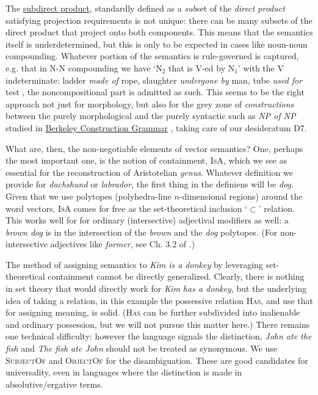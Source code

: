 \documentclass[output=paper,colorlinks=true,citecolor=brown]{langscibook}
\begin{document}
\noindent
The \href{https://en.wikipedia.org/wiki/Subdirect_product}{subdirect product},
standardly defined as a \emph{sub}set of the \emph{direct product} satisfying
projection requirements is not unique: there can be many subsets of the direct
product that project onto both components. This means that the semantics
itself is underdetermined, but this is only to be expected in cases like
noun-noun compounding. Whatever portion of the semantics is rule-governed is
captured, e.g. that in N-N compounding we have `N$_2$ that is V-ed by N$_1$'
with the V indeterminate: ladder \emph{made of} rope, slaughter \emph{undergone
  by} man, tube \emph{used for} test \citep{Kiparsky:1982b}, the
noncompositional part is admitted as such. This seems to be the right approach
not just for morphology, but also for the grey zone of \emph{constructions}
between the purely morphological and the purely syntactic such as \emph{NP of
  NP} studied in
\href{https://www1.icsi.berkeley.edu/~kay/bcg/ConGram.html}{Berkeley
  Construction Grammar} \citep{Kornai:1988a}, taking care of our desideratum
D7.

\medskip\noindent What are, then, the non-negotiable elements of vector
semantics? One, perhaps the most important one, is the notion of containment,
\textsc{IsA}, which we see as essential for the reconstruction of Aristotelian
\emph{genus}. Whatever definition we provide for \emph{dachshund} or \emph{labrador}, the first thing in the definiens will be \emph{dog}. Given that we
use polytopes (polyhedra-line $n$-dimensional regions) around the word
vectors, \textsc{IsA} comes for free as the set-theoretical inclusion `$\subset$'
relation. This works well for for ordinary (intersective) adjectival modifiers
as well: a \emph{brown dog} is in the intersection of the \emph{brown} and the
\emph{dog} polytopes. (For non-intersective adjectives like \emph{former}, see
Ch. 3.2 of \cite{Kornai:2022}.)

The method of assigning semantics to \emph{Kim is a donkey} by leveraging
set-theo\-ret\-ical containment cannot be directly generalized.  Clearly,
there is nothing in set theory that would directly work for \emph{Kim has a
  donkey}, but the underlying idea of taking a relation, in this example the
possessive relation \textsc{Has}, and use that for assigning meaning, is
solid. (\textsc{Has} can be further subdivided into inalienable and ordinary
possession, but we will not pursue this matter here.) There remains one
technical difficulty: however the language signals the distinction, \emph{John
  ate the fish} and \emph{The fish ate John} should not be treated as
synonymous. We use \textsc{SubjectOf} and \textsc{ObjectOf} for the
disambiguation. These are good candidates for universality, even in languages
where the distinction is made in absolutive/ergative terms.
\end{document}
